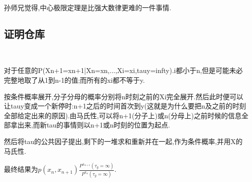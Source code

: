 \documentclass[a4paper,oneside]{ctexbook}
\begin{document}
		孙师兄觉得,中心极限定理是比强大数律更难的一件事情.

	\subsection{证明仓库}

		\begin{pf}[木师姐的证明]
			\label{mu}
			\ 

			对于任意的P(Xn+1=xn+1|Xn=xn,...,Xi=xi,tauy=infty).i都小于n,但是可能未必完整地取了从1到n-1的值;而所有的xi都不等于y.

			按条件概率展开,分子分母的概率分别将n时刻之前的Xi完全展开.然后此时便可以让tauy变成一个新停时:n+1之后的时间首次到y(这就是为什么要把n及之前的时刻全部给定出来的原因).由马氏性,可以将n+1(分子上)或n(分母上)之前时候的信息全部拿出来,而新tau的事情则以n+1或n时刻的位置为起点.

			然后将tau的公共因子提出,剩下的一堆求和重新并在一起,作为条件概率,并用X的马氏性.

			最终结果为$p(x_n,x_{n+1})\displaystyle\frac
			{P^{x_{n+1}}(\tau_y=\infty)}
			{P^{x_{n}}(\tau_y=\infty)}$.

		\end{pf}
\end{document}
